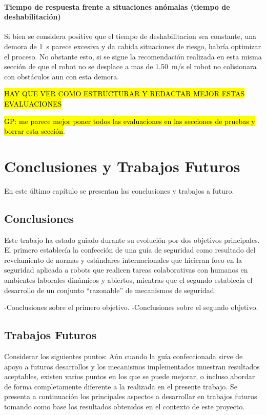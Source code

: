 \documentclass[withindex,glossary]{cam-thesis}
\begin{document}
\subsubsection{Tiempo de respuesta frente a situaciones anómalas (tiempo de deshabilitación)}
Si bien se considera positivo que el tiempo de deshabilitacion sea constante, una demora de \SI{1}{\second} parece excesiva y da cabida situaciones de riesgo, habría optimizar el proceso. No obstante esto, si se sigue la recomendación realizada en esta misma sección de que el robot no se desplace a mas de \SI{1.50}{\metre/\second} el robot no colisionara con obstáculos aun con esta demora.

\hl{HAY QUE VER COMO ESTRUCTURAR Y REDACTAR MEJOR ESTAS EVALUACIONES}

\hl{GP: me parece mejor poner todos las evaluaciones en las secciones de pruebas y borrar esta secci\'{o}n}.

\chapter{Conclusiones y Trabajos Futuros}

En este último capítulo se presentan las conclusiones y trabajos a futuro.

\section{Conclusiones}
Este trabajo ha estado guiado durante su evolución por dos objetivos principales. El primero establecía la confección de una guía de seguridad como resultado del revelamiento de normas y estándares internacionales que hicieran foco en la seguridad aplicada a robots que realicen tareas colaborativas con humanos en ambientes laborales dinámicos y abiertos, mientras que el segundo establecía el desarrollo de un conjunto ``razonable'' de mecanismos de seguridad.

-Conclusiones sobre el primero objetivo.
-Conclusiones sobre el segundo objetivo.

\section{Trabajos Futuros}
Considerar los siguientes puntos:
Aún cuando la guía confeccionada sirve de apoyo a futuros desarrollos y los mecanismos implementados muestran resultados aceptables, existen varios puntos en los que se puede mejorar, o incluso abordar de forma completamente diferente a la realizada en el presente trabajo.
Se presenta a continuación los principales aspectos a desarrollar en trabajos futuros tomando como base los resultados obtenidos en el contexto de este proyecto.
\end{document}
